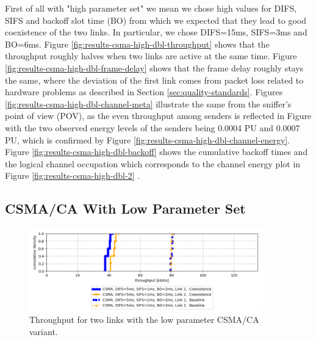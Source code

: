 First of all with "high parameter set" we mean we chose high values for DIFS, SIFS and backoff slot time (BO) from which we expected that they lead to good coexistence of the two links. In particular, we chose DIFS=15ms, SIFS=3ms and BO=6ms. Figure \ref{fig:results-csma-high-dbl-throughput} shows that the throughput roughly halves when two links are active at the same time. Figure \ref{fig:results-csma-high-dbl-frame-delay} shows that the frame delay roughly stays the same, where the deviation of the first link comes from packet loss related to hardware problems as described in Section \ref{sec:quality-standards}. Figures \ref{fig:results-csma-high-dbl-channel-meta} illustrate the same from the sniffer's point of view (POV), as the even throughput among senders is reflected in Figure  with the two observed energy levels of the senders being 0.0004 PU and 0.0007 PU, which is confirmed by Figure \ref{fig:results-csma-high-dbl-channel-energy}. Figure \ref{fig:results-csma-high-dbl-backoff} shows the cumulative backoff times and the logical channel occupation which corresponds to the channel energy plot in Figure \ref{fig:results-csma-high-dbl-2} . 

\clearpage

\subsection{CSMA/CA With Low Parameter Set}
\label{sec:csma-dbl-low}

\begin{figure}[b]
	\label{fig:results-csma-low-dbl-throughput}
	\begin{center}
		\includegraphics[width=0.9\textwidth]{pictures/results/same_combinations/csma_low_params/throughput_cdf}
	\end{center}
	\caption{Throughput for two links with the low parameter CSMA/CA variant.}
\end{figure}

